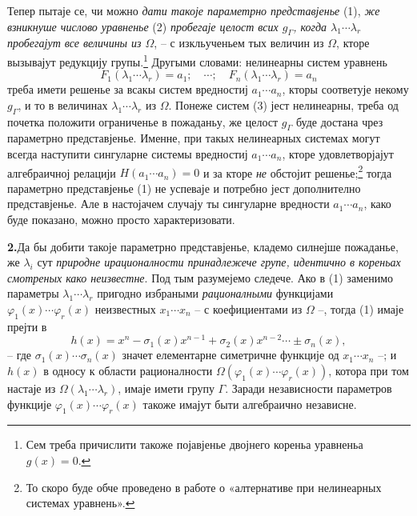 ﻿\documentclass[11pt]{article}
\begin{document}
Тепер пытаје се, чи можно {\itshape дати такоје параметрно представјенье} (1), {\itshape же взникнуше числово уравненье} (2) {\itshape пробегаје целост всих $g_\Gamma$, когда $\lambda_1\cdots\lambda_r$ пробегајут все величины из $\Omega$}, -- с изкльученьем тых величин из $\Omega$, кторе вызывајут редукцију групы.\footnote{Сем треба причислити такоже појавјенье двојнего кореньа уравненьа $g(x)=0$.} Другыми словами: нелинеарны систем уравнень
\begin{equation}
 F_1(\lambda_1\cdots\lambda_r)=a_1;\quad \cdots;\quad F_n(\lambda_1\cdots\lambda_r)=a_n
\tag{3}
\end{equation}
треба имети решенье за всакы систем вредностиј $a_1\cdots a_n$, кторы соответује некому $g_\Gamma$, и то в величинах $\lambda_1\cdots\lambda_r$ из $\Omega$. Понеже систем (3) јест нелинеарны, треба од почетка положити ограниченье в пожаданьу, же целост $g_\Gamma$ буде достана чрез параметрно представјенье. Именне, при такых нелинеарных системах могут всегда наступити сингуларне системы вредностиј $a_1\cdots a_n$, кторе удовлетворјајут алгебраичној релацији $H(a_1\cdots a_n)=0$ и за кторе {\itshape не} обстојит решенье;\footnote{То скоро буде обче проведено в работе о «алтернативе при нелинеарных системах уравнень».} тогда параметрно представјенье (1) не успеваје и потребно јест дополнително представјенье. Але в настојачем случају ты сингуларне вредности $a_1\cdots a_n$, како буде показано, можно просто характеризовати.

\noindent\textbf{2.}\quad Да бы добити такоје параметрно представјенье, кладемо силнејше пожаданье, же $\lambda_i$ сут {\itshape природне ирационалности принадлежече групе, идентично в кореньах смотреных како неизвестне}. Под тым разумејемо следече. Ако в (1) заменимо параметры $\lambda_1\cdots\lambda_r$ пригодно избраными {\itshape рационалными} функцијами $\varphi_1(x)\cdots\varphi_r(x)$ неизвестных $x_1\cdots x_n$ -- с коефициентами из $\Omega$ --, тогда (1) имаје прејти в
\begin{equation}
 h(x)=x^n-\sigma_1(x)x^{n-1}+\sigma_2(x)x^{n-2}\cdots\pm\sigma_n(x),
\tag{4}
\end{equation}
-- где $\sigma_1(x)\cdots\sigma_n(x)$ значет елементарне симетричне функције од $x_1\cdots x_n$ --; и $h(x)$ в односу к области рационалности $\Omega(\varphi_1(x)\cdots\varphi_r(x))$, котора при том настаје из $\Omega(\lambda_1\cdots\lambda_r)$, имаје имети групу $\Gamma$. Заради независности параметров функције $\varphi_1(x)\cdots\varphi_r(x)$ такоже имајут быти алгебраично независне.
\end{document}
